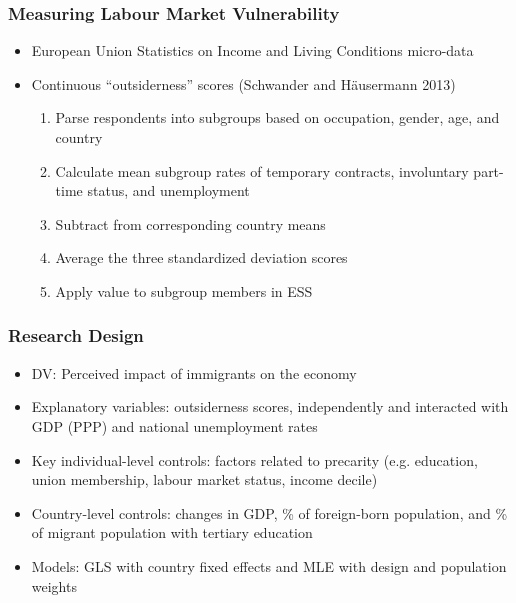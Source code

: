 \documentclass[14pt]{beamer}
\begin{document}
\begin{frame}
	\frametitle{Measuring Labour Market Vulnerability}
	\begin{itemize}
		\item European Union Statistics on Income and Living Conditions micro-data
		\pause
		\item Continuous ``outsiderness'' scores (Schwander and Häusermann 2013) 
		\begin{enumerate}
			\pause
			\item Parse respondents into subgroups based on occupation, gender, age, and country
			\pause
			\item Calculate mean subgroup rates of temporary contracts, involuntary part-time status, and unemployment
			\pause
			\item Subtract from corresponding country means 
			\pause
			\item Average the three standardized deviation scores
			\pause
			\item Apply value to subgroup members in ESS
		\end{enumerate}
	\end{itemize}
\end{frame}

\begin{frame}
	\frametitle{Research Design}
	\begin{itemize}[<+-| alert@+>]
		\item<1-> \alert<+>{DV:} Perceived impact of immigrants on the economy
		\item<2-> \alert<+>{Explanatory variables:} outsiderness scores, independently and interacted with GDP (PPP) and national unemployment rates
		\item<3-> \alert<+>{Key individual-level controls:} factors related to precarity (e.g. education, union membership, labour market status, income decile)
		\item<4-> \alert<+>{Country-level controls:} changes in GDP, \% of foreign-born population, and \% of migrant population with tertiary education
		\item<5-> \alert<+>{Models:} GLS with country fixed effects and MLE with design and population weights
	\end{itemize}
\end{frame}
\end{document}
